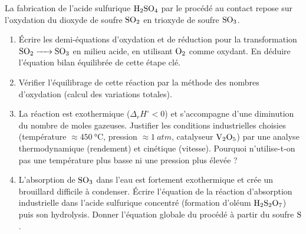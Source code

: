 \documentclass[11pt]{article}
\begin{document}
\begin{exercice}
La fabrication de l'acide sulfurique $\ce{H2SO4}$ par le procédé au contact repose sur l'oxydation du dioxyde de soufre $\ce{SO2}$ en trioxyde de soufre $\ce{SO3}$.
\begin{enumerate}
    \item Écrire les demi-équations d'oxydation et de réduction pour la transformation $\ce{SO2 -> SO3}$ en milieu acide, en utilisant $\ce{O2}$ comme oxydant. En déduire l'équation bilan équilibrée de cette étape clé.
    \item Vérifier l'équilibrage de cette réaction par la méthode des nombres d'oxydation (calcul des variations totales).
    \item La réaction est exothermique ($\Delta_r H^\circ < 0$) et s'accompagne d'une diminution du nombre de moles gazeuses. Justifier les conditions industrielles choisies (température $\approx \SI{450}{\celsius}$, pression $\approx \SI{1}{atm}$, catalyseur $\ce{V2O5}$) par une analyse thermodynamique (rendement) et cinétique (vitesse). Pourquoi n'utilise-t-on pas une température plus basse ni une pression plus élevée ?
    \item L'absorption de $\ce{SO3}$ dans l'eau est fortement exothermique et crée un brouillard difficile à condenser. Écrire l'équation de la réaction d'absorption industrielle dans l'acide sulfurique concentré (formation d'oléum $\ce{H2S2O7}$) puis son hydrolysis. Donner l'équation globale du procédé à partir du soufre $\ce{S}$.
\end{enumerate}
\end{exercice}
\end{document}
